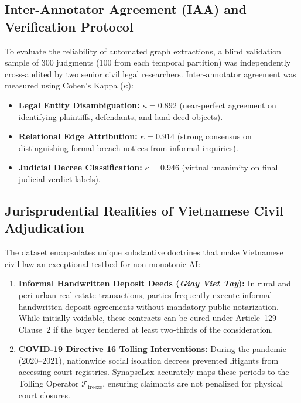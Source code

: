 \documentclass[11pt,a4paper]{article}
\begin{document}
\subsection{Inter-Annotator Agreement (IAA) and Verification Protocol}
To evaluate the reliability of automated graph extractions, a blind validation sample of 300 judgments (100 from each temporal partition) was independently cross-audited by two senior civil legal researchers. Inter-annotator agreement was measured using Cohen's Kappa ($\kappa$):
\begin{itemize}[leftmargin=*]
    \item \textbf{Legal Entity Disambiguation:} $\kappa = 0.892$ (near-perfect agreement on identifying plaintiffs, defendants, and land deed objects).
    \item \textbf{Relational Edge Attribution:} $\kappa = 0.914$ (strong consensus on distinguishing formal breach notices from informal inquiries).
    \item \textbf{Judicial Decree Classification:} $\kappa = 0.946$ (virtual unanimity on final judicial verdict labels).
\end{itemize}

\subsection{Jurisprudential Realities of Vietnamese Civil Adjudication}
The dataset encapsulates unique substantive doctrines that make Vietnamese civil law an exceptional testbed for non-monotonic AI:
\begin{enumerate}[label=(\roman*)]
    \item \textbf{Informal Handwritten Deposit Deeds (\textit{Giay Viet Tay}):} In rural and peri-urban real estate transactions, parties frequently execute informal handwritten deposit agreements without mandatory public notarization. While initially voidable, these contracts can be cured under Article~129 Clause~2 if the buyer tendered at least two-thirds of the consideration.
    \item \textbf{COVID-19 Directive 16 Tolling Interventions:} During the pandemic (2020--2021), nationwide social isolation decrees prevented litigants from accessing court registries. SynapseLex accurately maps these periods to the Tolling Operator $\mathcal{T}_{\text{freeze}}$, ensuring claimants are not penalized for physical court closures.
\end{enumerate}

\end{document}
